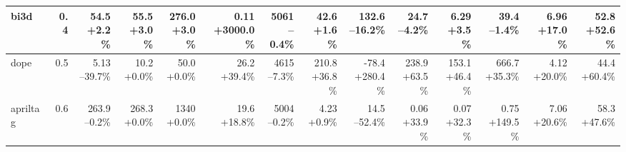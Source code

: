 \begin{table}[t]
{\begin{tabular}{lrrrrrrrrrrrrr}
\midrule
bi3d & 0.4 & \makecell[r]{54.5\\+2.2\%} & \makecell[r]{55.5\\+3.0\%} & \makecell[r]{276.0\\+3.0\%} & \makecell[r]{0.11\\+3000.0\%} & \makecell[r]{5061\\--0.4\%} & \makecell[r]{42.6\\+1.6\%} & \makecell[r]{132.6\\--16.2\%} & \makecell[r]{24.7\\--4.2\%} & \makecell[r]{6.29\\+3.5\%} & \makecell[r]{39.4\\--1.4\%} & \makecell[r]{6.96\\+17.0\%} & \makecell[r]{52.8\\+52.6\%} \\
\midrule
dope & 0.5 & \makecell[r]{5.13\\--39.7\%} & \makecell[r]{10.2\\+0.0\%} & \makecell[r]{50.0\\+0.0\%} & \makecell[r]{26.2\\+39.4\%} & \makecell[r]{4615\\--7.3\%} & \makecell[r]{210.8\\+36.8\%} & \makecell[r]{-78.4\\+280.4\%} & \makecell[r]{238.9\\+63.5\%} & \makecell[r]{153.1\\+46.4\%} & \makecell[r]{666.7\\+35.3\%} & \makecell[r]{4.12\\+20.0\%} & \makecell[r]{44.4\\+60.4\%} \\
\midrule
apriltag & 0.6 & \makecell[r]{263.9\\--0.2\%} & \makecell[r]{268.3\\+0.0\%} & \makecell[r]{1340\\+0.0\%} & \makecell[r]{19.6\\+18.8\%} & \makecell[r]{5004\\--0.2\%} & \makecell[r]{4.23\\+0.9\%} & \makecell[r]{14.5\\--52.4\%} & \makecell[r]{0.06\\+33.9\%} & \makecell[r]{0.07\\+32.3\%} & \makecell[r]{0.75\\+149.5\%} & \makecell[r]{7.06\\+20.6\%} & \makecell[r]{58.3\\+47.6\%} \\

\end{tabular}}
\end{table}
